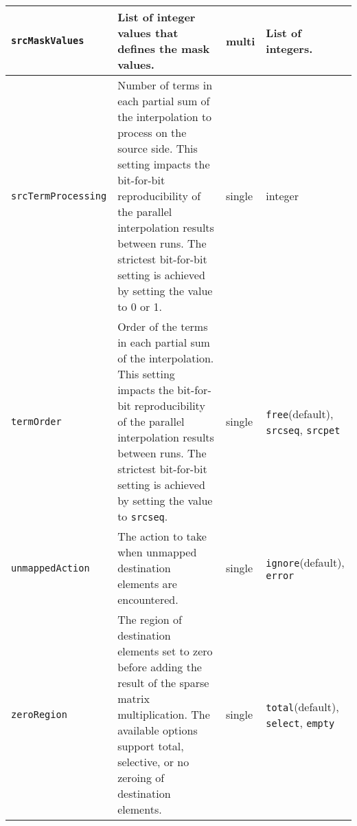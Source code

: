 \begin{longtable}{|p{5cm}|p{5cm}|p{1cm}|p{35mm}|}
     {\tt srcMaskValues} & List of integer values that defines the mask values. & multi & List of integers.\\ \hline
     {\tt srcTermProcessing} & Number of terms in each partial sum of the interpolation to process on the source side. This setting impacts the bit-for-bit reproducibility of the parallel interpolation results between runs. The strictest bit-for-bit setting is achieved by setting the value to 0 or 1. & single & integer\\ \hline
     {\tt termOrder} & Order of the terms in each partial sum of the interpolation. This setting impacts the bit-for-bit reproducibility of the parallel interpolation results between runs. The strictest bit-for-bit setting is achieved by setting the value to {\tt srcseq}. & single & {\tt free}(default), {\tt srcseq}, {\tt srcpet}\\ \hline
     {\tt unmappedAction} & The action to take when unmapped destination elements are encountered. & single & {\tt ignore}(default), {\tt error}\\ \hline
     {\tt zeroRegion} & The region of destination elements set to zero before adding the result of the sparse matrix multiplication. The available options support total, selective, or no zeroing of destination elements. & single & {\tt total}(default), {\tt select}, {\tt empty}\\ \hline
     \hline
\end{longtable}

